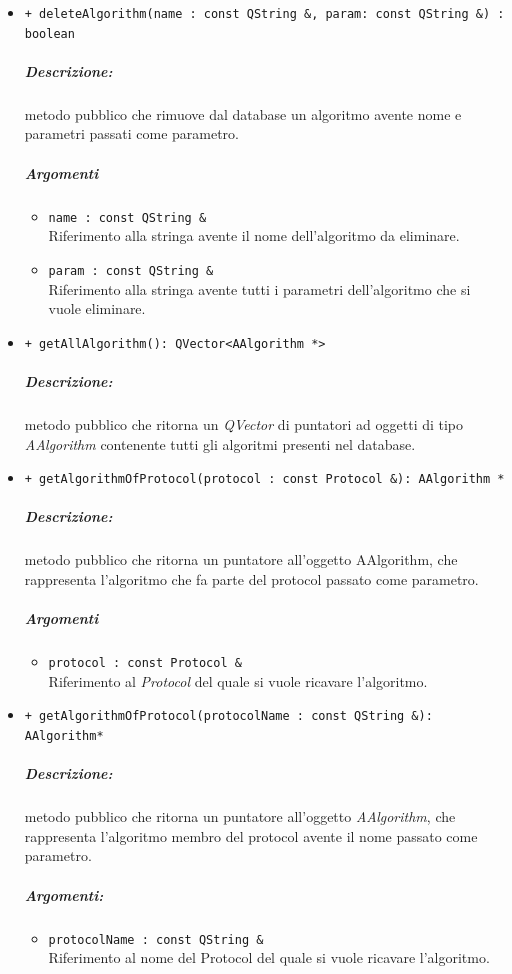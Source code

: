 \begin{itemize}
		\item \color{blue}\verb!+ deleteAlgorithm(name : const QString &, param: const QString &) : boolean!\\
		\color{black} 
		\subparagraph{Descrizione:} metodo pubblico che rimuove dal database un algoritmo avente nome e parametri passati come parametro.
		\subparagraph{Argomenti}
			\begin{itemize}
				\item \color{RoyalPurple}\verb!name : const QString &! \\ 
				\color{black}Riferimento alla stringa avente il nome dell'algoritmo da eliminare.
				\item \color{RoyalPurple}\verb!param : const QString &! \\ 
				\color{black}Riferimento alla stringa avente tutti i parametri dell'algoritmo che si vuole eliminare.
			\end{itemize}
			
		\item \color{blue}\verb!+ getAllAlgorithm(): QVector<AAlgorithm *>!
		\color{black}
		\subparagraph{Descrizione:} metodo pubblico che ritorna un \textsl{QVector} di puntatori ad oggetti di tipo \textsl{AAlgorithm} contenente tutti gli algoritmi presenti nel database.
		
		\item \color{blue}\verb!+ getAlgorithmOfProtocol(protocol : const Protocol &): AAlgorithm *!\\
		\color{black} 
		\subparagraph{Descrizione:} metodo pubblico che ritorna un puntatore all'oggetto AAlgorithm, che rappresenta l'algoritmo che fa parte del protocol passato come parametro.
		\subparagraph{Argomenti}
			\begin{itemize}
				\item \color{RoyalPurple}\verb!protocol : const Protocol &! \\ 
				\color{black}Riferimento al \textsl{Protocol} del quale si vuole ricavare l'algoritmo.
			\end{itemize}

		\item \color{blue}\verb!+ getAlgorithmOfProtocol(protocolName : const QString &): AAlgorithm*!\\
		\color{black} 
		\subparagraph{Descrizione:} metodo pubblico che ritorna un puntatore all'oggetto \textsl{AAlgorithm}, che rappresenta l'algoritmo membro del protocol\g{} avente il nome passato come parametro.
		\subparagraph{Argomenti:}
			\begin{itemize}
				\item \color{RoyalPurple}\verb!protocolName : const QString &! \\
				\color{black} Riferimento al nome del Protocol\g{} del quale si vuole ricavare l'algoritmo.
			\end{itemize}
		

\end{itemize}
